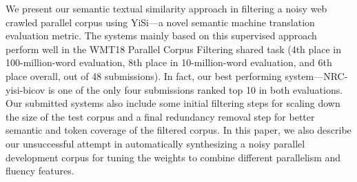 We present our semantic textual similarity approach in filtering a noisy web crawled parallel corpus using YiSi---a novel semantic machine translation evaluation metric. The systems mainly based on this supervised approach perform well in the WMT18 Parallel Corpus Filtering shared task (4th place in 100-million-word evaluation, 8th place in 10-million-word evaluation, and 6th place overall, out of 48 submissions). In fact, our best performing system---NRC-yisi-bicov is one of the only four submissions ranked top 10 in both evaluations. Our submitted systems also include some initial filtering steps for scaling down the size of the test corpus and a final redundancy removal step for better semantic and token coverage of the filtered corpus. In this paper, we also describe our unsuccessful attempt in automatically synthesizing a noisy parallel development corpus for tuning the weights to combine different parallelism and fluency features.
